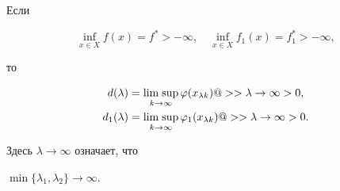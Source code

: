 \begin{lems}\label{l2.1}


Если 


$$




\inf\limits_{x\in X}f(x) = f^{*} > -\infty,\quad


\inf\limits_{x\in X}f_1(x) = f_1^{*} > -\infty,






$$


то


\begin{align}\label{e3.3.5}


d(\lambda) &= \Limsup\limits_{k\rightarrow \infty}\varphi(x_{\lambda k})


@>>{\lambda\to \infty}>0, \\


%


\label{e3.3.5a}


d_1(\lambda) &= \Limsup\limits_{k\rightarrow\infty}\varphi_1(x_{\lambda k})


@>>{\lambda\to \infty}>0.


\end{align}


Здесь $\lambda \to \infty$ означает, что


$\min\{\lambda_1,\lambda_2\} \to \infty$.


\end{lems}





